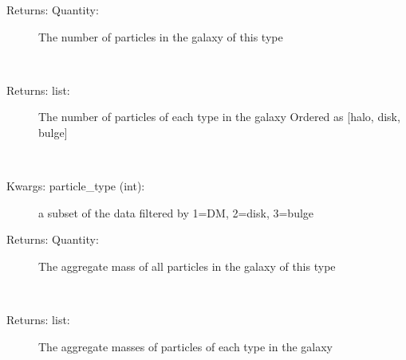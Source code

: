 \documentclass[letterpaper,10pt,english]{sphinxmanual}
\begin{document}
\begin{fulllineitems}
\begin{fulllineitems}
\begin{description}
\item[{Returns: Quantity:}] \leavevmode
The number of particles in the galaxy of this type

\end{description}

\end{fulllineitems}


\begin{fulllineitems}
\label{\detokenize{galaxy:galaxy.galaxy.Galaxy.all_component_counts}}~\begin{description}
\item[{Returns: list:}] \leavevmode
The number of particles of each type in the galaxy
Ordered as {[}halo, disk, bulge{]}

\end{description}

\end{fulllineitems}


\begin{fulllineitems}
\label{\detokenize{galaxy:galaxy.galaxy.Galaxy.component_mass}}~\begin{description}
\item[{Kwargs: particle\_type (int):}] \leavevmode
a subset of the data filtered by 1=DM, 2=disk, 3=bulge

\item[{Returns: Quantity:}] \leavevmode
The aggregate mass of all particles in the galaxy of this type

\end{description}

\end{fulllineitems}


\begin{fulllineitems}
\label{\detokenize{galaxy:galaxy.galaxy.Galaxy.all_component_masses}}~\begin{description}
\item[{Returns: list:}] \leavevmode
The aggregate masses of particles of each type in the galaxy


\end{description}
\end{fulllineitems}
\end{fulllineitems}
\end{document}

